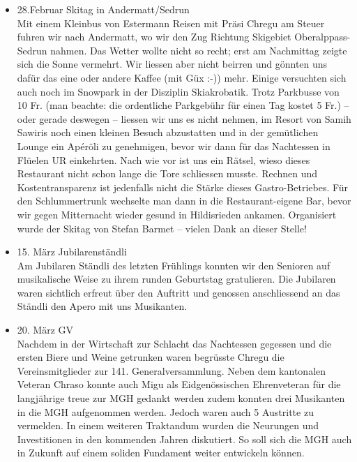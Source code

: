 \begin{history}
\begin{itemize}
            \item 28.Februar Skitag in Andermatt/Sedrun\\
                  Mit einem Kleinbus von Estermann Reisen mit Präsi Chregu am
                  Steuer fuhren wir nach Andermatt, wo wir den Zug Richtung
                  Skigebiet Oberalppass-Sedrun nahmen. Das Wetter wollte nicht
                  so recht; erst am Nachmittag zeigte sich die Sonne vermehrt.
                  Wir liessen aber nicht beirren und gönnten uns dafür das eine
                  oder andere Kaffee (mit Güx :-)) mehr. Einige versuchten sich
                  auch noch im Snowpark in der Disziplin Skiakrobatik. Trotz
                  Parkbusse von 10 Fr. (man beachte: die ordentliche Parkgebühr
                  für einen Tag kostet 5 Fr.) – oder gerade deswegen – liessen
                  wir uns es nicht nehmen, im Resort von Samih Sawiris noch
                  einen kleinen Besuch abzustatten und in der gemütlichen Lounge
                  ein Apéröli zu genehmigen, bevor wir dann für das Nachtessen
                  in Flüelen UR einkehrten. Nach wie vor ist uns ein Rätsel,
                  wieso dieses Restaurant nicht schon lange die Tore schliessen
                  musste. Rechnen und Kostentransparenz ist jedenfalls nicht die
                  Stärke dieses Gastro-Betriebes. Für den Schlummertrunk
                  wechselte man dann in die Restaurant-eigene Bar, bevor wir
                  gegen Mitternacht wieder gesund in Hildisrieden ankamen.
                  Organisiert wurde der Skitag von Stefan Barmet – vielen Dank
                  an dieser Stelle!

            \item 15. März Jubilarenständli\\
                  Am Jubilaren Ständli des letzten Frühlings konnten wir den
                  Senioren auf musikalische Weise zu ihrem runden Geburtstag
                  gratulieren. Die Jubilaren waren sichtlich erfreut über den
                  Auftritt und genossen anschliessend an das Ständli den Apero
                  mit uns Musikanten.

            \item 20. März GV\\
                  Nachdem in der Wirtschaft zur Schlacht das Nachtessen gegessen
                  und die ersten Biere und Weine getrunken waren begrüsste
                  Chregu die Vereinsmitglieder zur 141. Generalversammlung.
                  Neben dem kantonalen Veteran Chraso konnte auch Migu als
                  Eidgenössischen Ehrenveteran für die langjährige treue zur MGH
                  gedankt werden zudem konnten drei Musikanten in die MGH
                  aufgenommen werden. Jedoch waren auch 5 Austritte zu
                  vermelden. In einem weiteren Traktandum wurden die Neurungen
                  und Investitionen in den kommenden Jahren diskutiert. So soll
                  sich die MGH auch in Zukunft auf einem soliden Fundament
                  weiter entwickeln können.


\end{itemize}
\end{history}
